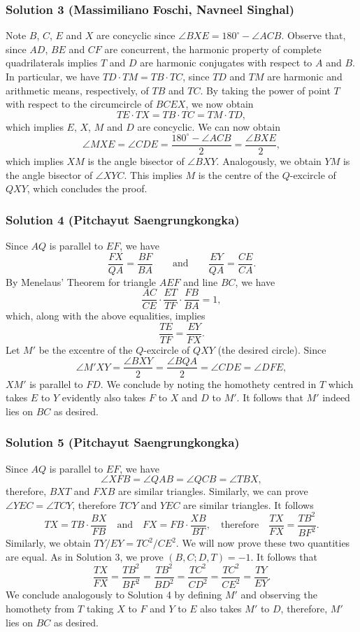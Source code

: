 \subsubsection{Solution 3 (Massimiliano Foschi, Navneel Singhal)}
Note $B$, $C$, $E$ and $X$ are concyclic since $\angle BXE=180^\circ-\angle ACB$.
\nl
Observe that, since $AD$, $BE$ and $CF$ are concurrent, the harmonic property of complete quadrilaterals implies $T$ and $D$ are harmonic conjugates with respect to $A$ and $B$. In particular, we have $TD\cdot TM=TB\cdot TC$, since $TD$ and $TM$ are harmonic and arithmetic means, respectively, of $TB$ and $TC$.
\nl
By taking the power of point $T$ with respect to the circumcircle of $BCEX$, we now obtain
$$TE\cdot TX=TB\cdot TC=TM\cdot TD,$$
which implies $E$, $X$, $M$ and $D$ are concyclic.
\nl
We can now obtain
$$\angle MXE=\angle CDE=\frac{180^\circ-\angle ACB}{2}=\frac{\angle BXE}{2},$$
which implies $XM$ is the angle bisector of $\angle BXY$. Analogously, we obtain $YM$ is the angle bisector of $\angle XYC$. This implies $M$ is the centre of the $Q$-excircle of $QXY$, which concludes the proof.
\subsubsection{Solution 4 (Pitchayut Saengrungkongka)}
Since $AQ$ is parallel to $EF$, we have
$$\frac{FX}{QA}=\frac{BF}{BA}\qquad\text{and}\qquad \frac{EY}{QA}=\frac{CE}{CA}.$$
By Menelaus' Theorem for triangle $AEF$ and line $BC$, we have
$$\frac{AC}{CE}\cdot\frac{ET}{TF}\cdot\frac{FB}{BA}=1,$$
which, along with the above equalities, implies
$$\frac{TE}{TF}=\frac{EY}{FX}.$$
Let $M'$ be the excentre of the $Q$-excircle of $QXY$ (the desired circle). Since
$$\angle M'XY=\frac{\angle BXY}{2}=\frac{\angle BQA}{2}=\angle CDE=\angle DFE,$$
$XM'$ is parallel to $FD$. We conclude by noting the homothety centred in $T$ which takes $E$ to $Y$ evidently also takes $F$ to $X$ and $D$ to $M'$. It follows that $M'$ indeed lies on $BC$ as desired.
\subsubsection{Solution 5 (Pitchayut Saengrungkongka)}
Since $AQ$ is parallel to $EF$, we have
$$\angle XFB=\angle QAB=\angle QCB=\angle TBX,$$
therefore, $BXT$ and $FXB$ are similar triangles. Similarly, we can prove $\angle YEC=\angle TCY$, therefore $TCY$ and $YEC$ are similar triangles. It follows
$$TX=TB\cdot \frac{BX}{FB}\quad\text{and}\quad FX=FB\cdot\frac{XB}{BT},\quad\text{therefore}\quad\frac{TX}{FX}=\frac{TB^2}{BF^2}.$$
Similarly, we obtain $TY/EY=TC^2/CE^2$. We will now prove these two quantities are equal.
\nl
As in Solution 3, we prove $(B, C; D, T)=-1$. It follows that
$$\frac{TX}{FX}=\frac{TB^2}{BF^2}=\frac{TB^2}{BD^2}=\frac{TC^2}{CD^2}=\frac{TC^2}{CE^2}=\frac{TY}{EY}.$$
We conclude analogously to Solution 4 by defining $M'$ and observing the homothety from $T$ taking $X$ to $F$ and $Y$ to $E$ also takes $M'$ to $D$, therefore, $M'$ lies on $BC$ as desired.
